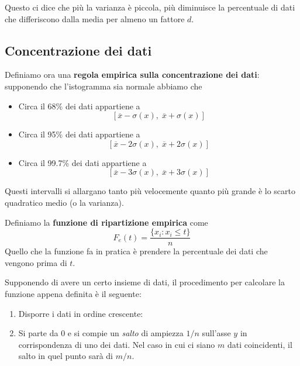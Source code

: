 \begin{observation}
	Questo ci dice che più la varianza è piccola, più diminuisce la percentuale di dati che differiscono dalla media
	per	almeno un fattore $d$.
\end{observation}

\subsection{Concentrazione dei dati}
\begin{definition}
	Definiamo ora una \textbf{regola empirica sulla concentrazione dei dati}: supponendo che l'istogramma sia normale
	abbiamo che
	\begin{itemize}
		\item Circa il 68\% dei dati appartiene a
		      \[ [ \overline{x} - \sigma(x),\; \overline{x} + \sigma(x) ] \]
		\item Circa il 95\% dei dati appartiene a
		      \[ [ \overline{x} - 2 \sigma(x),\; \overline{x} + 2 \sigma(x) ] \]
		\item Circa il 99.7\% dei dati appartiene a
		      \[ [ \overline{x} - 3 \sigma(x),\; \overline{x} + 3 \sigma(x) ] \]
	\end{itemize}
	Questi intervalli si allargano tanto più velocemente quanto più grande è lo scarto quadratico medio (o la varianza).
\end{definition}

\begin{definition}
	Definiamo la \textbf{funzione di ripartizione empirica} come
	\[ F_e(t) = \frac{\{ x_i : x_i \leq t \}}{n} \]
	Quello che la funzione fa in pratica è prendere la percentuale dei dati che vengono prima di $t$.
\end{definition}

Supponendo di avere un certo insieme di dati, il procedimento per calcolare la funzione appena definita è il seguente:
\begin{enumerate}
	\item Disporre i dati in ordine crescente:
	\item Si parte da 0 e si compie un \emph{salto} di ampiezza $1 / n$ sull'asse $y$ in corrispondenza di uno dei dati.
	      Nel caso in cui ci siano $m$ dati coincidenti, il salto in quel punto sarà di $m / n$.
\end{enumerate}

